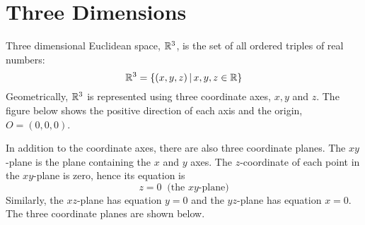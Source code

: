 \documentclass[handout]{ximera}
\begin{document}
\section{Three Dimensions}
Three dimensional Euclidean space, $\mathbb R^3$, is the set of all ordered triples of real numbers:
\[
\mathbb R^3 = \{(x,y,z)\,|\, x,y,z \in \mathbb R \}
\]
Geometrically, $\mathbb R^3$ is represented using three coordinate axes, $x, y$ and $z$.
The figure below shows the positive direction of each axis and the origin, $O = (0,0,0)$.
\begin{image}
\end{image}
In addition to the coordinate axes, there are also three coordinate planes.  
The $xy$-plane is the plane containing the $x$ and $y$ axes.  
The $z$-coordinate of each point in the $xy$-plane is zero, hence its equation is
\[
z = 0 \;\; \text{(the $xy$-plane)}
\]
Similarly, the $xz$-plane has equation $y = 0$ and the $yz$-plane has equation $x=0$.
The three coordinate planes are shown below.
\begin{image}
\end{image}
\end{document}
